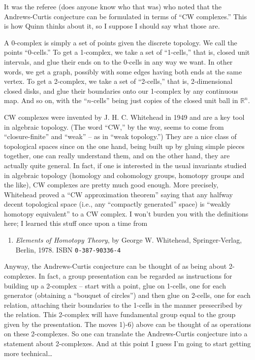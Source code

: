\documentclass{article}
\def\tightlist{}
\begin{document}
It was the referee (does anyone know who that was) who noted that the
Andrews-Curtis conjecture can be formulated in terms of ``CW
complexes.'' This is how Quinn thinks about it, so I suppose I should
say what those are.

A 0-complex is simply a set of points given the discrete topology. We
call the points ``0-cells.'' To get a 1-complex, we take a set of
``1-cells,'' that is, closed unit intervals, and glue their ends on to
the 0-cells in any way we want. In other words, we get a graph, possibly
with some edges having both ends at the same vertex. To get a 2-complex,
we take a set of ``2-cells,'' that is, 2-dimensional closed disks, and
glue their boundaries onto our 1-complex by any continuous map. And so
on, with the ``\(n\)-cells'' being just copies of the closed unit ball
in \(\mathbb{R}^n\).

CW complexes were invented by J. H. C. Whitehead in 1949 and are a key
tool in algebraic topology. (The word ``CW,'' by the way, seems to come
from ``closure-finite'' and ``weak'' -- as in ``weak topology.'') They
are a nice class of topological spaces since on the one hand, being
built up by gluing simple pieces together, one can really understand
them, and on the other hand, they are actually quite general. In fact,
if one is interested in the usual invariants studied in algebraic
topology (homology and cohomology groups, homotopy groups and the like),
CW complexes are pretty much good enough. More precisely, Whitehead
proved a ``CW approximation theorem'' saying that any halfway decent
topological space (i.e., any ``compactly generated'' space) is ``weakly
homotopy equivalent'' to a CW complex. I won't burden you with the
definitions here; I learned this stuff once upon a time from

\begin{enumerate}
\def\labelenumi{\arabic{enumi})}
\setcounter{enumi}{3}
\tightlist
\item
  \emph{Elements of Homotopy Theory}, by George W. Whitehead,
  Springer-Verlag, Berlin, 1978. ISBN \texttt{0-387-90336-4}
\end{enumerate}

Anyway, the Andrews-Curtis conjecture can be thought of as being about
2-complexes. In fact, a group presentation can be regarded as
instructions for building up a 2-complex -- start with a point, glue on
1-cells, one for each generator (obtaining a ``bouquet of circles'') and
then glue on 2-cells, one for each relation, attaching their boundaries
to the 1-cells in the manner presecribed by the relation. This 2-complex
will have fundamental group equal to the group given by the
presentation. The moves 1)-6) above can be thought of as operations on
these 2-complexes. So one can translate the Andrews-Curtis conjecture
into a statement about 2-complexes. And at this point I guess I'm going
to start getting more technical\ldots{}
\end{document}
